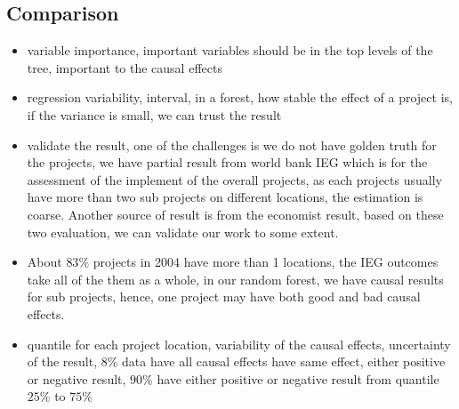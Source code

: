 \subsection{Comparison}


\begin{itemize}
\item variable importance, important variables should be in the top levels of the tree, important to the causal effects
\item regression variability, interval, in a forest, how stable the effect of  a project is, if the variance is small, we can trust the result
\item validate the result, one of the challenges is we do not have golden truth for the projects, we have partial result from world bank IEG which is for the assessment of the implement of the overall projects, as each projects usually have more than two sub projects on different locations, the estimation is coarse. Another source of result is from the economist result,
based on these two evaluation, we can validate our work to some extent. 

\item About $83\%$ projects in 2004 have more than 1 locations, the IEG outcomes take all of the them as a whole, in our random forest, we have causal results for sub projects, hence, one project may have both good and bad causal effects.

\item quantile for each project location, variability of the causal effects, uncertainty of the result, $8\%$ data have all causal effects have same effect, either positive or negative result, $90\%$ have either positive or negative result from quantile $25\%$ to $75\%$
 
\end{itemize}



